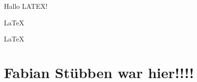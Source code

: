 \documentclass{article}
\begin{document}
Hallo LATEX!  
   
\LaTeX 

\huge
\LaTeX 
\section{Fabian Stübben war hier!!!!}
\end{document}
